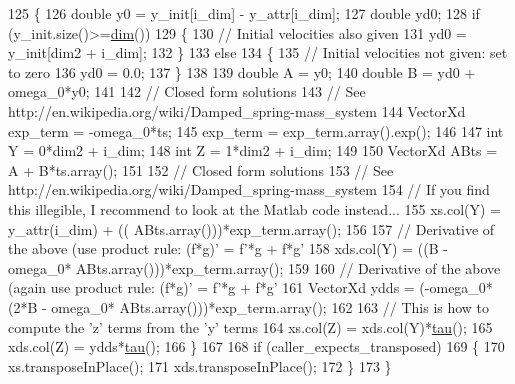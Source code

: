 \begin{DoxyCode}
125   \{
126     \textcolor{keywordtype}{double} y0 = y\_init[i\_dim] - y\_attr[i\_dim];
127     \textcolor{keywordtype}{double} yd0;
128     \textcolor{keywordflow}{if} (y\_init.size()>=\hyperlink{group__DynamicalSystems_ga6f628f7f4ed9d77bf69f5b8560b98f18}{dim}())
129     \{
130       \textcolor{comment}{// Initial velocities also given}
131       yd0 = y\_init[dim2 + i\_dim];          
132     \}
133     \textcolor{keywordflow}{else}
134     \{
135       \textcolor{comment}{// Initial velocities not given: set to zero}
136       yd0 = 0.0;
137     \}
138           
139     \textcolor{keywordtype}{double} A = y0;
140     \textcolor{keywordtype}{double} B = yd0 + omega\_0*y0;
141     
142     \textcolor{comment}{// Closed form solutions}
143     \textcolor{comment}{// See http://en.wikipedia.org/wiki/Damped\_spring-mass\_system}
144     VectorXd exp\_term  = -omega\_0*ts;
145     exp\_term = exp\_term.array().exp();
146   
147     \textcolor{keywordtype}{int} Y  = 0*dim2 + i\_dim;
148     \textcolor{keywordtype}{int} Z  = 1*dim2 + i\_dim;
149    
150     VectorXd ABts = A + B*ts.array();
151     
152     \textcolor{comment}{// Closed form solutions}
153     \textcolor{comment}{// See http://en.wikipedia.org/wiki/Damped\_spring-mass\_system}
154     \textcolor{comment}{// If you find this illegible, I recommend to look at the Matlab code instead...}
155     xs.col(Y)  =  y\_attr(i\_dim) +      ((   ABts.array()))*exp\_term.array();
156                                                     
157     \textcolor{comment}{// Derivative of the above (use product rule: (f*g)' = f'*g + f*g'}
158     xds.col(Y) =                    ((B - omega\_0*   ABts.array()))*exp\_term.array();
159                                                     
160     \textcolor{comment}{// Derivative of the above (again use product    rule: (f*g)' = f'*g + f*g'}
161     VectorXd ydds   =    (-omega\_0*(2*B - omega\_0*   ABts.array()))*exp\_term.array();
162       
163     \textcolor{comment}{// This is how to compute the 'z' terms from the 'y' terms}
164     xs.col(Z)  = xds.col(Y)*\hyperlink{group__DynamicalSystems_ga50eec7ad4c9664b5809ace45b22200d5}{tau}();
165     xds.col(Z) = ydds*\hyperlink{group__DynamicalSystems_ga50eec7ad4c9664b5809ace45b22200d5}{tau}();
166   \}
167         
168   \textcolor{keywordflow}{if} (caller\_expects\_transposed)
169   \{
170     xs.transposeInPlace();
171     xds.transposeInPlace();
172   \}
173 \}
\end{DoxyCode}


